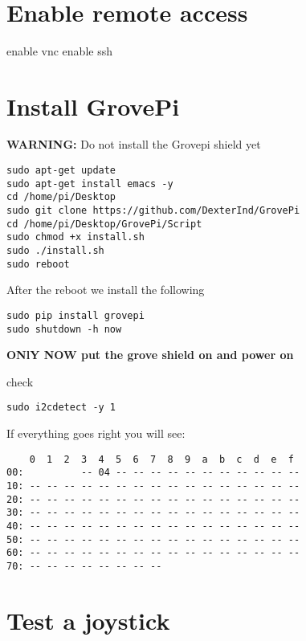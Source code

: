 \MDNAME\

\section{Enable remote access}

enable vnc enable ssh

\section{Install GrovePi}

\textbf{WARNING:} Do not install the Grovepi shield yet

\begin{lstlisting}
sudo apt-get update
sudo apt-get install emacs -y
cd /home/pi/Desktop
sudo git clone https://github.com/DexterInd/GrovePi
cd /home/pi/Desktop/GrovePi/Script
sudo chmod +x install.sh
sudo ./install.sh
sudo reboot
\end{lstlisting}

After the reboot we install the following

\begin{lstlisting}
sudo pip install grovepi
sudo shutdown -h now
\end{lstlisting}

\textbf{ONlY NOW put the grove shield on and power on}

check

\begin{lstlisting}
sudo i2cdetect -y 1
\end{lstlisting}

If everything goes right you will see:

\begin{lstlisting}
    0  1  2  3  4  5  6  7  8  9  a  b  c  d  e  f
00:          -- 04 -- -- -- -- -- -- -- -- -- -- -- 
10: -- -- -- -- -- -- -- -- -- -- -- -- -- -- -- -- 
20: -- -- -- -- -- -- -- -- -- -- -- -- -- -- -- -- 
30: -- -- -- -- -- -- -- -- -- -- -- -- -- -- -- -- 
40: -- -- -- -- -- -- -- -- -- -- -- -- -- -- -- -- 
50: -- -- -- -- -- -- -- -- -- -- -- -- -- -- -- -- 
60: -- -- -- -- -- -- -- -- -- -- -- -- -- -- -- --
70: -- -- -- -- -- -- -- --        
\end{lstlisting}

\section{Test a joystick}

